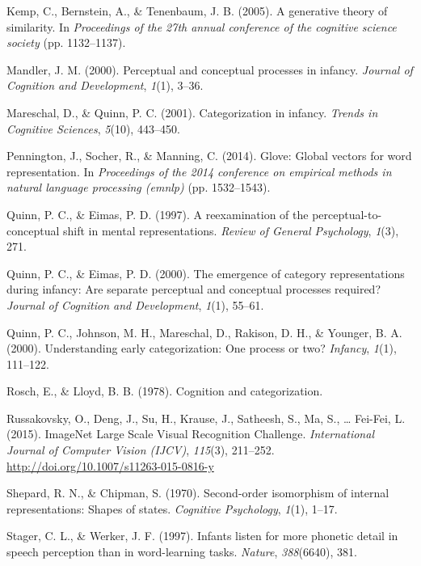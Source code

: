 \documentclass[10pt, letterpaper]{article}
\begin{document}
\hypertarget{ref-kemp2005generative}{}
Kemp, C., Bernstein, A., \& Tenenbaum, J. B. (2005). A generative theory
of similarity. In \emph{Proceedings of the 27th annual conference of the
cognitive science society} (pp. 1132--1137).

\hypertarget{ref-mandler2000perceptual}{}
Mandler, J. M. (2000). Perceptual and conceptual processes in infancy.
\emph{Journal of Cognition and Development}, \emph{1}(1), 3--36.

\hypertarget{ref-mareschal2001categorization}{}
Mareschal, D., \& Quinn, P. C. (2001). Categorization in infancy.
\emph{Trends in Cognitive Sciences}, \emph{5}(10), 443--450.

\hypertarget{ref-pennington2014glove}{}
Pennington, J., Socher, R., \& Manning, C. (2014). Glove: Global vectors
for word representation. In \emph{Proceedings of the 2014 conference on
empirical methods in natural language processing (emnlp)} (pp.
1532--1543).

\hypertarget{ref-quinn1997reexamination}{}
Quinn, P. C., \& Eimas, P. D. (1997). A reexamination of the
perceptual-to-conceptual shift in mental representations. \emph{Review
of General Psychology}, \emph{1}(3), 271.

\hypertarget{ref-quinn2000emergence}{}
Quinn, P. C., \& Eimas, P. D. (2000). The emergence of category
representations during infancy: Are separate perceptual and conceptual
processes required? \emph{Journal of Cognition and Development},
\emph{1}(1), 55--61.

\hypertarget{ref-quinn2000understanding}{}
Quinn, P. C., Johnson, M. H., Mareschal, D., Rakison, D. H., \& Younger,
B. A. (2000). Understanding early categorization: One process or two?
\emph{Infancy}, \emph{1}(1), 111--122.

\hypertarget{ref-rosch1978cognition}{}
Rosch, E., \& Lloyd, B. B. (1978). Cognition and categorization.

\hypertarget{ref-ILSVRC15}{}
Russakovsky, O., Deng, J., Su, H., Krause, J., Satheesh, S., Ma, S.,
\ldots{} Fei-Fei, L. (2015). ImageNet Large Scale Visual Recognition
Challenge. \emph{International Journal of Computer Vision (IJCV)},
\emph{115}(3), 211--252. \url{http://doi.org/10.1007/s11263-015-0816-y}

\hypertarget{ref-shepard1970second}{}
Shepard, R. N., \& Chipman, S. (1970). Second-order isomorphism of
internal representations: Shapes of states. \emph{Cognitive Psychology},
\emph{1}(1), 1--17.

\hypertarget{ref-stager1997infants}{}
Stager, C. L., \& Werker, J. F. (1997). Infants listen for more phonetic
detail in speech perception than in word-learning tasks. \emph{Nature},
\emph{388}(6640), 381.
\end{document}
